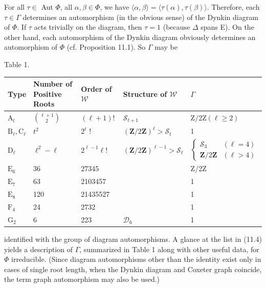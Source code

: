 \documentclass[10pt]{article}
\begin{document}
For all $\tau \in$ Aut $\Phi$, all $\alpha, \beta \in \Phi$, we have $\langle\alpha, \beta\rangle=\langle\tau(\alpha), \tau(\beta)\rangle$. Therefore, each $\tau \in \Gamma$ determines an automorphism (in the obvious sense) of the Dynkin diagram of $\Phi$. If $\tau$ acts trivially on the diagram, then $\tau=1$ (because $\Delta$ spans E). On the other hand, each automorphism of the Dynkin diagram obviously determines an automorphism of $\Phi$ (cf. Proposition 11.1). So $\Gamma$ may be

Table 1.

\begin{center}
\begin{tabular}{|l|l|l|l|l|}
\hline
Type & Number of Positive Roots & Order of $\mathscr{W}$ & Structure of $\mathscr{W}$ & $\Gamma$ \\
\hline
$\mathrm{A}_{l}$ & $\binom{\ell+1}{2}$ & $(\ell+1)!$ & $\mathscr{S}_{t+1}$ & $\mathrm{Z} / 2 \mathrm{Z}(\ell \geq 2)$ \\
\hline
$\mathrm{B}_{\ell}, \mathrm{C}_{\ell}$ & $t^{2}$ & $2^{t}$ ! & $(\mathbf{Z} / 2 \mathbf{Z})^{\ell}>\mathscr{S}_{t}$ & 1 \\
\hline
$\mathrm{D}_{\ell}$ & $\ell^{2}-\ell$ & $2^{\ell-1} \ell!$ & $(\mathbf{Z} / 2 \mathbf{Z})^{\ell-1}>\mathscr{S}_{\ell}$ & $\left\{\begin{array}{cl}\mathscr{S}_{3} & (\ell=4) \\ \mathbf{Z} / 2 \mathbf{Z} & (\ell>4)\end{array}\right.$ \\
\hline
$\mathrm{E}_{6}$ & 36 & 27345 &  & Z/2Z \\
\hline
$\mathrm{E}_{7}$ & 63 & 2103457 &  & 1 \\
\hline
$\mathrm{E}_{8}$ & 120 & 21435527 &  & 1 \\
\hline
$\mathrm{F}_{4}$ & 24 & 2732 &  & 1 \\
\hline
$\mathrm{G}_{2}$ & 6 & 223 & $\mathscr{D}_{6}$ & 1 \\
\hline
\end{tabular}
\end{center}

identified with the group of diagram automorphisms. A glance at the list in (11.4) yields a description of $\Gamma$, summarized in Table 1 along with other useful data, for $\Phi$ irreducible. (Since diagram automorphisms other than the identity exist only in cases of single root length, when the Dynkin diagram and Coxeter graph coincide, the term graph automorphism may also be used.)
\end{document}

